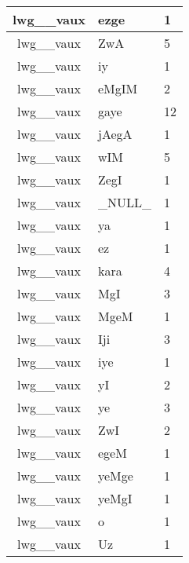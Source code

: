 \documentclass[a4 paper]{article}
\begin{document}
\begin{longtable}{cp{}p{}}
lwg\_\_vaux & ezge & 1\\ \midrule lwg\_\_vaux & ZwA & 5\\ \midrule lwg\_\_vaux & iy & 1\\ \midrule lwg\_\_vaux & eMgIM & 2\\ \midrule lwg\_\_vaux & gaye & 12\\ \midrule lwg\_\_vaux & jAegA & 1\\ \midrule lwg\_\_vaux & wIM & 5\\ \midrule lwg\_\_vaux & ZegI & 1\\ \midrule lwg\_\_vaux & \_NULL\_ & 1\\ \midrule lwg\_\_vaux & ya & 1\\ \midrule lwg\_\_vaux & ez & 1\\ \midrule lwg\_\_vaux & kara & 4\\ \midrule lwg\_\_vaux & MgI & 3\\ \midrule lwg\_\_vaux & MgeM & 1\\ \midrule lwg\_\_vaux & Iji & 3\\ \midrule lwg\_\_vaux & iye & 1\\ \midrule lwg\_\_vaux & yI & 2\\ \midrule lwg\_\_vaux & ye & 3\\ \midrule lwg\_\_vaux & ZwI & 2\\ \midrule lwg\_\_vaux & egeM & 1\\ \midrule lwg\_\_vaux & yeMge & 1\\ \midrule lwg\_\_vaux & yeMgI & 1\\ \midrule lwg\_\_vaux & o & 1\\ \midrule lwg\_\_vaux & Uz & 1\\ \midrule 

\end{longtable}
\end{document}
